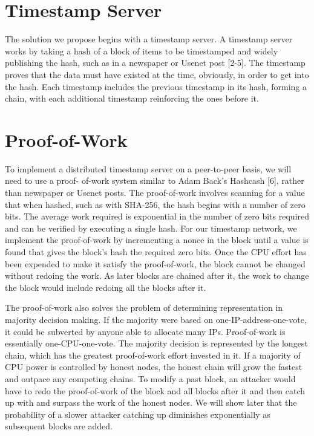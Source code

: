 \documentclass{article}
\begin{document}
\section{Timestamp Server}\label{sec:timestamp-server}
The solution we propose begins with a timestamp server.
A timestamp server works by taking a
hash of a block of items to be timestamped and widely publishing the hash, such as in a
newspaper or Usenet post [2-5].
The timestamp proves that the data must have existed at the
time, obviously, in order to get into the hash.
Each timestamp includes the previous timestamp in
its hash, forming a chain, with each additional timestamp reinforcing the ones before it.



\section{Proof-of-Work}\label{sec:proof-of-work}
To implement a distributed timestamp server on a peer-to-peer basis, we will need to use a proof-
of-work system similar to Adam Back's Hashcash [6], rather than newspaper or Usenet posts.
The proof-of-work involves scanning for a value that when hashed, such as with SHA-256, the
hash begins with a number of zero bits.
The average work required is exponential in the number
of zero bits required and can be verified by executing a single hash.
For our timestamp network, we implement the proof-of-work by incrementing a nonce in the
block until a value is found that gives the block's hash the required zero bits.
Once the CPU
effort has been expended to make it satisfy the proof-of-work, the block cannot be changed
without redoing the work.
As later blocks are chained after it, the work to change the block
would include redoing all the blocks after it.



The proof-of-work also solves the problem of determining representation in majority decision making.
If the majority were based on one-IP-address-one-vote, it could be subverted by anyone
able to allocate many IPs. Proof-of-work is essentially one-CPU-one-vote.
The majority
decision is represented by the longest chain, which has the greatest proof-of-work effort invested
in it.
If a majority of CPU power is controlled by honest nodes, the honest chain will grow the
fastest and outpace any competing chains.
To modify a past block, an attacker would have to
redo the proof-of-work of the block and all blocks after it and then catch up with and surpass the
work of the honest nodes.
We will show later that the probability of a slower attacker catching up
diminishes exponentially as subsequent blocks are added.
\end{document}
